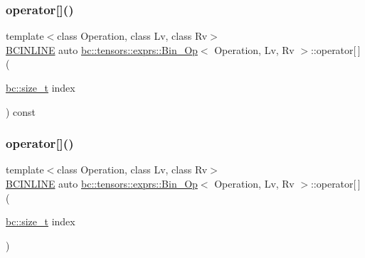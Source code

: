 \mbox{\label{structbc_1_1tensors_1_1exprs_1_1Bin__Op_a0034e76e2f2b0f48de36f38055336e4e}} 
\subsubsection{\texorpdfstring{operator[]()}{operator[]()}\hspace{0.1cm}{\footnotesize\ttfamily [1/2]}}
{\footnotesize\ttfamily template$<$class Operation, class Lv, class Rv$>$ \\
\hyperlink{common_8h_a6699e8b0449da5c0fafb878e59c1d4b1}{B\+C\+I\+N\+L\+I\+NE} auto \hyperlink{structbc_1_1tensors_1_1exprs_1_1Bin__Op}{bc\+::tensors\+::exprs\+::\+Bin\+\_\+\+Op}$<$ Operation, Lv, Rv $>$\+::operator\mbox{[}$\,$\mbox{]} (\begin{DoxyParamCaption}\item[{\hyperlink{namespacebc_aaf8e3fbf99b04b1b57c4f80c6f55d3c5}{bc\+::size\+\_\+t}}]{index }\end{DoxyParamCaption}) const\hspace{0.3cm}{\ttfamily [inline]}}

\mbox{\label{structbc_1_1tensors_1_1exprs_1_1Bin__Op_a4f15e91266888a28f787ed18ecbffe00}} 
\subsubsection{\texorpdfstring{operator[]()}{operator[]()}\hspace{0.1cm}{\footnotesize\ttfamily [2/2]}}
{\footnotesize\ttfamily template$<$class Operation, class Lv, class Rv$>$ \\
\hyperlink{common_8h_a6699e8b0449da5c0fafb878e59c1d4b1}{B\+C\+I\+N\+L\+I\+NE} auto \hyperlink{structbc_1_1tensors_1_1exprs_1_1Bin__Op}{bc\+::tensors\+::exprs\+::\+Bin\+\_\+\+Op}$<$ Operation, Lv, Rv $>$\+::operator\mbox{[}$\,$\mbox{]} (\begin{DoxyParamCaption}\item[{\hyperlink{namespacebc_aaf8e3fbf99b04b1b57c4f80c6f55d3c5}{bc\+::size\+\_\+t}}]{index }\end{DoxyParamCaption})\hspace{0.3cm}{\ttfamily [inline]}}

